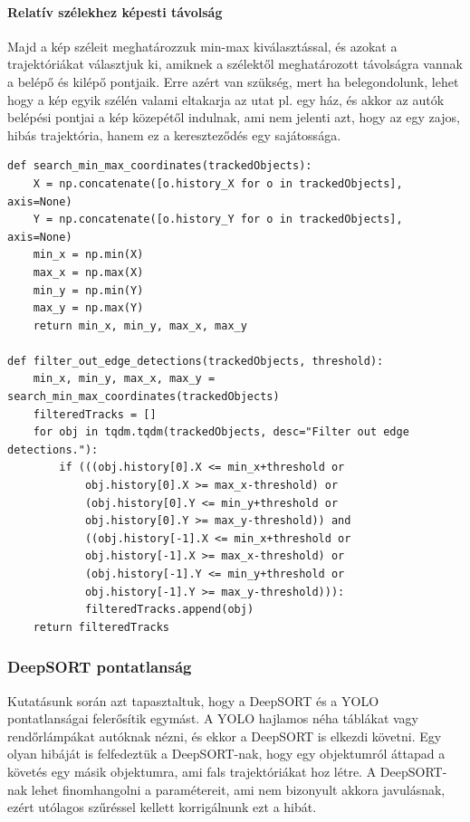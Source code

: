 \documentclass[12pt,a4paper]{article}
\begin{document}
\paragraph{Relatív szélekhez képesti távolság} Majd a kép széleit meghatározzuk min-max kiválasztással, és azokat a trajektóriákat választjuk ki, amiknek a szélektől meghatározott
távolságra vannak a belépő és kilépő pontjaik. Erre azért van szükség, mert ha belegondolunk, lehet hogy a kép egyik szélén valami eltakarja az utat pl. egy ház, és akkor az autók belépési pontjai a kép közepétől indulnak, ami nem jelenti azt, hogy az egy zajos, hibás trajektória, hanem ez a kereszteződés egy sajátossága.
\newpage
\begin{verbatim}
def search_min_max_coordinates(trackedObjects):
    X = np.concatenate([o.history_X for o in trackedObjects], axis=None)
    Y = np.concatenate([o.history_Y for o in trackedObjects], axis=None)
    min_x = np.min(X)
    max_x = np.max(X)
    min_y = np.min(Y)
    max_y = np.max(Y)
    return min_x, min_y, max_x, max_y

def filter_out_edge_detections(trackedObjects, threshold):
    min_x, min_y, max_x, max_y = search_min_max_coordinates(trackedObjects)
    filteredTracks = []
    for obj in tqdm.tqdm(trackedObjects, desc="Filter out edge detections."):
        if (((obj.history[0].X <= min_x+threshold or 
            obj.history[0].X >= max_x-threshold) or
            (obj.history[0].Y <= min_y+threshold or 
            obj.history[0].Y >= max_y-threshold)) and
            ((obj.history[-1].X <= min_x+threshold or 
            obj.history[-1].X >= max_x-threshold) or
            (obj.history[-1].Y <= min_y+threshold or 
            obj.history[-1].Y >= max_y-threshold))):
            filteredTracks.append(obj)
    return filteredTracks
\end{verbatim}

\subsubsection{DeepSORT pontatlanság}
Kutatásunk során azt tapasztaltuk, hogy a DeepSORT és a YOLO pontatlanságai felerősítik egymást. A YOLO hajlamos néha táblákat
vagy rendőrlámpákat autóknak nézni, és ekkor a DeepSORT is elkezdi követni. Egy olyan hibáját is felfedeztük a DeepSORT-nak, hogy
egy objektumról áttapad a követés egy másik objektumra, ami fals trajektóriákat hoz létre. A DeepSORT-nak lehet finomhangolni a
paramétereit, ami nem bizonyult akkora javulásnak, ezért utólagos szűréssel kellett korrigálnunk ezt a hibát. 
\end{document}
